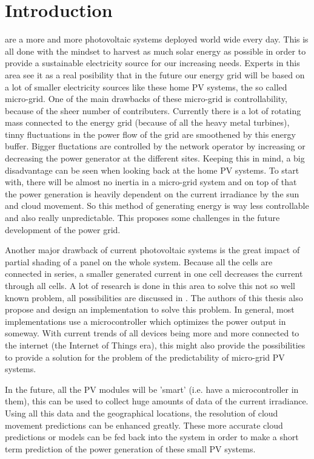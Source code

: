 \documentclass[a4paper,journal]{DDREAM}
\begin{document}
\section{Introduction}\label{sec:introduction}
 are a more and more photovoltaic systems deployed world wide every day.
This is all done with the mindset to harvest as much solar energy as possible in order to provide a sustainable electricity source for our increasing needs.
Experts in this area see it as a real posibility that in the future our energy grid will be based on a lot of smaller electricity sources like these home PV systems, the so called micro-grid.
One of the main drawbacks of these micro-grid is controllability, because of the sheer number of contributers.
Currently there is a lot of rotating mass connected to the energy grid (because of all the heavy metal turbines), tinny fluctuations in the power flow of the grid are smoothened by this energy buffer.
Bigger fluctations are controlled by the network operator by increasing or decreasing the power generator at the different sites.
Keeping this in mind, a big disadvantage can be seen when looking back at the home PV systems.
To start with, there will be almost no inertia in a micro-grid system and on top of that the power generation is heavily dependent on the current irradiance by the sun and cloud movement.
So this method of generating energy is way less controllable and also really unpredictable.
This proposes some challenges in the future development of the power grid.

Another major drawback of current photovoltaic systems is the great impact of partial shading of a panel on the whole system.
Because all the cells are connected in series, a smaller generated current in one cell decreases the current through all cells.
A lot of research is done in this area to solve this not so well known problem, all possibilities are discussed in \cite{SoCeBa}.
The authors of this thesis also propose and design an implementation to solve this problem.
In general, most implementations use a microcontroller which optimizes the power output in someway.
With current trends of all devices being more and more connected to the internet (the Internet of Things era), this might also provide the possibilities to provide a solution for the problem of the predictability of micro-grid PV systems.

In the future, all the PV modules will be 'smart' (i.e. have a microcontroller in them), this can be used to collect huge amounts of data of the current irradiance.
Using all this data and the geographical locations, the resolution of cloud movement predictions can be enhanced greatly.
These more accurate cloud predictions or models can be fed back into the system in order to make a short term prediction of the power generation of these small PV systems.
\end{document}
